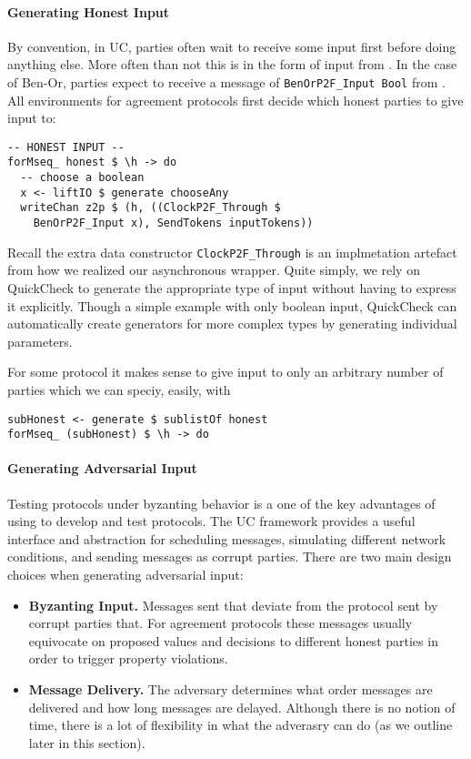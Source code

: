 \paragraph{Generating Honest Input}
By convention, in UC, parties often wait to receive some input first before doing anything else. More often than not this is in the form of input from \Z.
In the case of Ben-Or, parties expect to receive a message of \texttt{BenOrP2F\_Input Bool} from \Z.
All environments for agreement protocols first decide which honest parties to give input to:
\begin{lstlisting}
-- HONEST INPUT --
forMseq_ honest $ \h -> do
  -- choose a boolean
  x <- liftIO $ generate chooseAny
  writeChan z2p $ (h, ((ClockP2F_Through $ 
    BenOrP2F_Input x), SendTokens inputTokens))
\end{lstlisting}
Recall the extra data constructor \texttt{ClockP2F\_Through} is an implmetation artefact from how we realized our asynchronous wrapper.
Quite simply, we rely on QuickCheck to generate the appropriate type of input without having to express it explicitly. 
Though a simple example with only boolean input, QuickCheck can automatically create generators for more complex types by generating individual parameters. 

For some protocol it makes sense to give input to only an arbitrary number of parties which we can speciy, easily, with 
\begin{lstlisting}
subHonest <- generate $ sublistOf honest
forMseq_ (subHonest) $ \h -> do
\end{lstlisting}

\paragraph{Generating Adversarial Input}
Testing protocols under byzanting behavior is a one of the key advantages of using \us to develop and test protocols. 
The UC framework provides a useful interface and abstraction for scheduling messages, simulating different network conditions, and sending messages as corrupt parties.  
There are two main design choices when generating adversarial input:
\begin{itemize}
\item \textbf{Byzanting Input.} Messages sent that deviate from the protocol sent by corrupt parties that. For agreement protocols these messages usually equivocate on proposed values and decisions to different honest parties in order to trigger property violations.
\item \textbf{Message Delivery.} The adversary determines what order messages are delivered and how long messages are delayed. Although there is no notion of time, there is a lot of flexibility in what the adverasry can do (as we outline later in this section).
\end{itemize}

